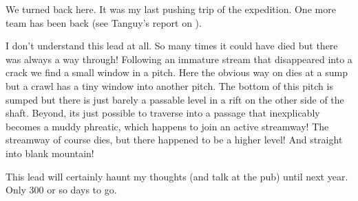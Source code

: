 We turned back here. It was my last pushing trip of the expedition. One more team has been back (see Tanguy's report on ).
 
I don't understand this lead at all. So many times it could have died but there was always a way through! Following an immature stream that disappeared into a crack we find a small window in a pitch. Here the obvious way on dies at a sump but a crawl has a tiny window into another pitch. The bottom of this pitch is sumped but there is just barely a passable level in a rift on the other side of the shaft. Beyond, its just possible to traverse into a passage that inexplicably becomes a muddy phreatic, which happens to join an active streamway! The streamway of course dies, but there happened to be a higher level! And straight into blank mountain!
 
This lead will certainly haunt my thoughts (and talk at the pub) until next year. Only 300 or so days to go.

